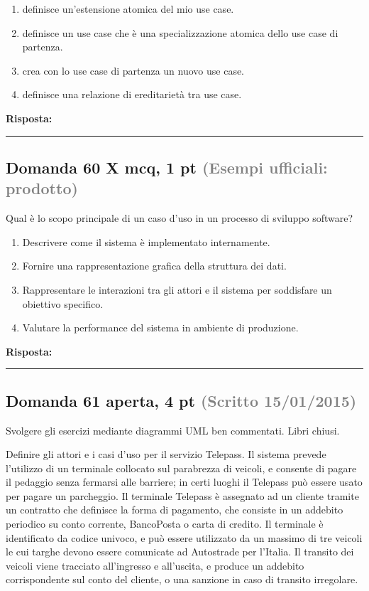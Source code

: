 \documentclass[a4paper,11pt]{article}
\begin{document}
\begin{enumerate}[label=\alph*)]
\item definisce un'estensione atomica del mio use case.
\item definisce un use case che è una specializzazione atomica dello use case di partenza.
\item crea con lo use case di partenza un nuovo use case.
\item definisce una relazione di ereditarietà tra use case.
\end{enumerate}
\vspace{0.2cm}
\noindent\textbf{Risposta:}\par
\vspace{1.5cm}\hrule


\subsection*{Domanda 60 X \hfill {\small mcq, 1 pt \textcolor{gray}{(Esempi ufficiali: prodotto)}}}
Qual è lo scopo principale di un caso d'uso in un processo di sviluppo software?

\begin{enumerate}[label=\alph*)]
\item Descrivere come il sistema è implementato internamente.
\item Fornire una rappresentazione grafica della struttura dei dati.
\item Rappresentare le interazioni tra gli attori e il sistema per soddisfare un obiettivo specifico.
\item Valutare la performance del sistema in ambiente di produzione.
\end{enumerate}
\vspace{0.2cm}
\noindent\textbf{Risposta:}\par
\vspace{1.5cm}\hrule


\subsection*{Domanda 61 \hfill {\small aperta, 4 pt \textcolor{gray}{(Scritto 15/01/2015)}}}
\begin{tcolorbox}[colback=gray!8,colframe=gray!50,title=Contesto]
Svolgere gli esercizi mediante diagrammi UML ben commentati. Libri chiusi.
\end{tcolorbox}
Definire gli attori e i casi d'uso per il servizio Telepass. Il sistema prevede l'utilizzo di un terminale collocato sul parabrezza di veicoli, e consente di pagare il pedaggio senza fermarsi alle barriere; in certi luoghi il Telepass può essere usato per pagare un parcheggio. Il terminale Telepass è assegnato ad un cliente tramite un contratto che definisce la forma di pagamento, che consiste in un addebito periodico su conto corrente, BancoPosta o carta di credito. Il terminale è identificato da codice univoco, e può essere utilizzato da un massimo di tre veicoli le cui targhe devono essere comunicate ad Autostrade per l'Italia. Il transito dei veicoli viene tracciato all'ingresso e all'uscita, e produce un addebito corrispondente sul conto del cliente, o una sanzione in caso di transito irregolare.
\end{document}

